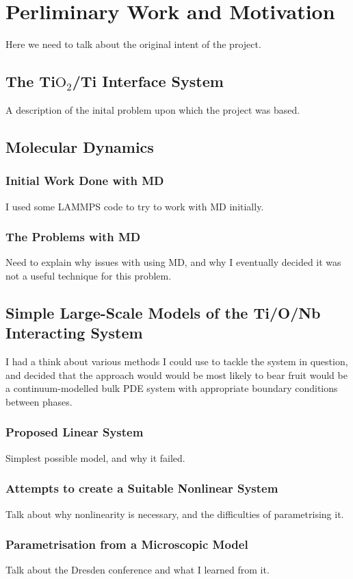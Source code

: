 \chapter{Perliminary Work and Motivation}

Here we need to talk about the original intent of the project.

\section{The Ti$\text{O}_2$/Ti Interface System}

A description of the inital problem upon which the project was based.

\section{Molecular Dynamics}

\subsection{Initial Work Done with MD}
I used some LAMMPS code to try to work with MD initially.
\subsection{The Problems with MD}
Need to explain why issues with using MD, and why I eventually decided it was not a useful technique for this problem.

\section{Simple Large-Scale Models of the Ti/O/Nb Interacting System}
I had a think about various methods I could use to tackle the system in question, and decided that the approach would would be most likely to bear fruit would be a continuum-modelled bulk PDE system with appropriate boundary conditions between
phases.
\subsection{Proposed Linear System}
Simplest possible model, and why it failed.
\subsection{Attempts to create a Suitable Nonlinear System}
Talk about why nonlinearity is necessary, and the difficulties of parametrising it.
\subsection{Parametrisation from a Microscopic Model}
Talk about the Dresden conference and what I learned from it.